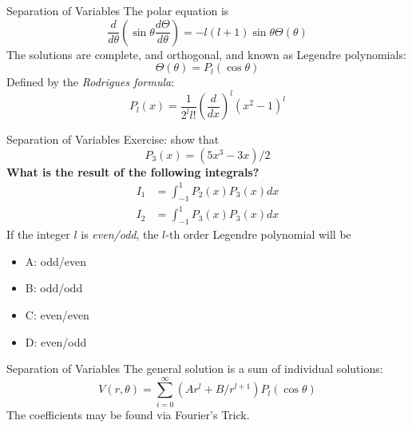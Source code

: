 \documentclass{beamer}
\begin{document}
\begin{frame}{Separation of Variables}
The polar equation is
\begin{equation}
\frac{d}{d\theta}\left(\sin\theta \frac{d\Theta}{d\theta} \right) = -l(l+1)\sin\theta \Theta(\theta)
\end{equation}
The solutions are \alert{complete}, and \alert{orthogonal}, and known as Legendre polynomials:
\begin{equation}
\Theta(\theta) = P_l(\cos\theta)
\end{equation}
Defined by the \textit{Rodrigues formula}:
\begin{equation}
P_l(x) = \frac{1}{2^ll!} \left(\frac{d}{dx}\right)^l (x^2 -1)^l
\end{equation}
\end{frame}

\begin{frame}{Separation of Variables}
Exercise: show that 
\begin{equation}
P_3(x) = (5x^3 - 3x)/2
\end{equation}
\alert{\textbf{What is the result of the following integrals?}}
\begin{align}
I_1 &= \int_{-1}^{1} P_2(x) P_3(x) dx \\
I_2 &= \int_{-1}^{1} P_3(x) P_3(x) dx
\end{align}
If the integer $l$ is \textit{even/odd}, the $l$-th order Legendre polynomial will be
\begin{itemize}
\item A: odd/even
\item B: odd/odd
\item C: even/even
\item D: even/odd
\end{itemize}
\end{frame}

\begin{frame}{Separation of Variables}
The general solution is a sum of individual solutions:
\begin{equation}
V(r,\theta) = \sum_{i = 0}^{\infty} \left( Ar^l + B/r^{l+1} \right) P_l(\cos\theta)
\end{equation}
The coefficients may be found via Fourier's Trick.
\end{frame}
\end{document}
